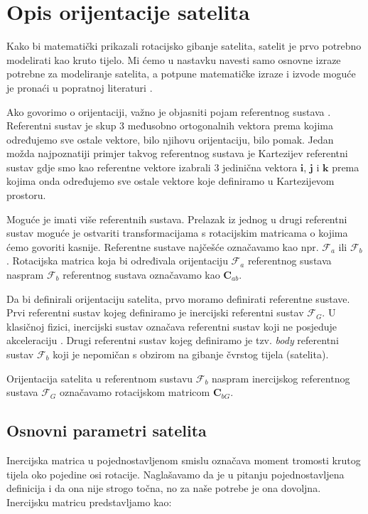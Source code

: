 \documentclass[times, utf8, diplomski, numeric]{templates/template}
\begin{document}
\chapter{Opis orijentacije satelita}{
    Kako bi matematički prikazali rotacijsko gibanje satelita, satelit je prvo potrebno modelirati kao kruto tijelo. Mi ćemo u nastavku navesti samo osnovne izraze potrebne za modeliranje satelita, a potpune matematičke izraze i izvode moguće je pronaći u popratnoj literaturi \cite{adcsKnjiga}.

    Ako govorimo o orijentaciji, važno je objasniti pojam referentnog sustava . Referentni sustav je skup 3 međusobno ortogonalnih vektora prema kojima određujemo sve ostale vektore, bilo njihovu orijentaciju, bilo pomak. Jedan možda najpoznatiji primjer takvog referentnog sustava je Kartezijev referentni sustav gdje smo kao referentne vektore izabrali 3 jedinična vektora $\boldsymbol{i}$, $\boldsymbol{j}$ i $\boldsymbol{k}$ prema kojima onda određujemo sve ostale vektore koje definiramo u Kartezijevom prostoru. 

    Moguće je imati više referentnih sustava. Prelazak iz jednog u drugi referentni sustav moguće je ostvariti transformacijama s rotacijskim matricama o kojima ćemo govoriti kasnije. Referentne sustave najčešće označavamo kao npr. $\mathcal{F}_a$ ili $\mathcal{F}_b$. Rotacijska matrica koja bi određivala orijentaciju $\mathcal{F}_a$ referentnog sustava naspram $\mathcal{F}_b$ referentnog sustava označavamo kao $\boldsymbol{C}_{ab}$.

    Da bi definirali orijentaciju satelita, prvo moramo definirati referentne sustave. Prvi referentni sustav kojeg definiramo je inercijski referentni sustav $\mathcal{F}_G$. U klasičnoj fizici, inercijski sustav označava referentni sustav koji ne posjeduje akceleraciju \cite{inertialFrame}. Drugi referentni sustav kojeg definiramo je tzv. \emph{body} referentni sustav $\mathcal{F}_b$ koji je nepomičan s obzirom na gibanje čvrstog tijela (satelita).

    Orijentacija satelita u referentnom sustavu $\mathcal{F}_b$ naspram inercijskog referentnog sustava $\mathcal{F}_G$ označavamo rotacijskom matricom $\boldsymbol{C}_{bG}$.

    \section{Osnovni parametri satelita}{
    \label{section:osnovni_parametri_satelita}
        Inercijska matrica  u pojednostavljenom smislu označava moment tromosti krutog tijela oko pojedine osi rotacije. Naglašavamo da je u pitanju pojednostavljena definicija i da ona nije strogo točna, no za naše potrebe je ona dovoljna. Inercijsku matricu predstavljamo kao:

}}
\end{document}
